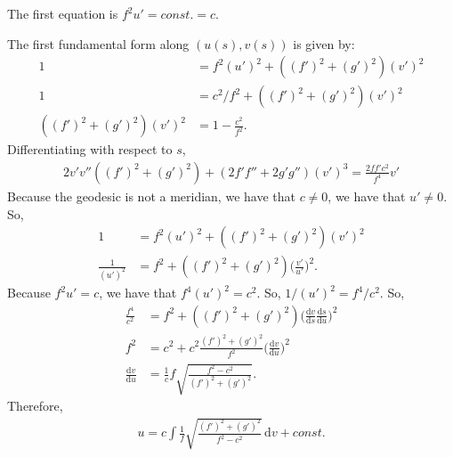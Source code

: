 \documentclass[10pt]{article}
\newcommand{\dee}{\mathrm{d}}
\begin{document}
\begin{itemize}
    The first equation is $f^2 u' = const. = c$.

    The first fundamental form along $(u(s), v(s))$ is given by:
    \begin{align*}
      1 &= f^2 (u')^2 + ((f')^2 + (g')^2) (v')^2\\
      1 &= c^2 / f^2 + ((f')^2 + (g')^2) (v')^2\\
      ((f')^2 + (g')^2) (v')^2 &= 1 - \frac{c^2}{f^2}.
    \end{align*}
    Differentiating with respect to $s$,
    \begin{align*}
      2 v' v'' ((f')^2 + (g')^2) + (2f'f'' + 2g'g'')(v')^3 = \frac{2ff'c^2}{f^4} v'
    \end{align*}
    Because the geodesic is not a meridian, we have that $c \neq 0$, we have that $u' \neq 0$. So,
    \begin{align*}
      1 &= f^2 (u')^2 + ((f')^2 + (g')^2) (v')^2\\
      \frac{1}{(u')^2} &= f^2 + ((f')^2 + (g')^2) \bigg( \frac{v'}{u'} \bigg)^2.
    \end{align*}
    Because $f^2 u' = c$, we have that $f^4 (u')^2 = c^2$. So, $1/(u')^2 = f^4 /c^2$. So,
    \begin{align*}
      \frac{f^4}{c^2} &= f^2 + ((f')^2 + (g')^2) \bigg( \frac{\dee v }{\dee s} \frac{\dee s}{\dee u} \bigg)^2\\
      f^2 &= c^2 + c^2 \frac{(f')^2 + (g')^2}{f^2} \bigg( \frac{\dee v}{\dee u} \bigg)^2\\
      \frac{\dee v}{\dee u} &= \frac{1}{c} f \sqrt{\frac{f^2 - c^2}{(f')^2 + (g')^2}}.      
    \end{align*}
    Therefore,
    \begin{align*}
      u = c \int \frac{1}{f} \sqrt{\frac{(f')^2 + (g')^2}{f^2 - c^2}}\, \dee v + const.
    \end{align*}    
  \end{itemize}  
\end{document}

